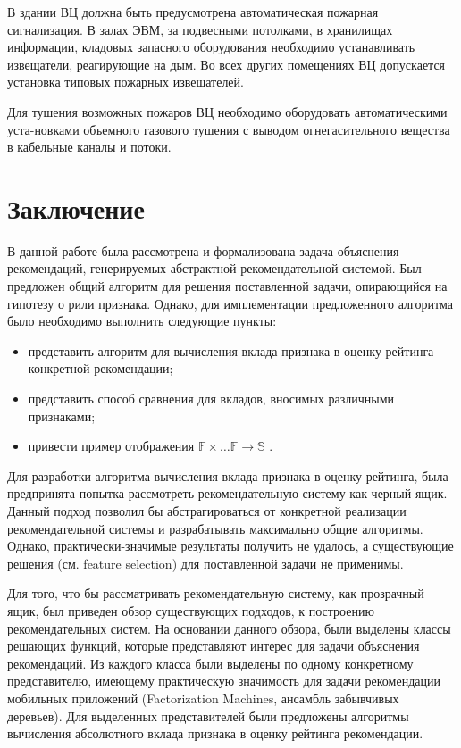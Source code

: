 \documentclass[12pt,a4paper]{report}
\begin{document}
В здании ВЦ должна быть предусмотрена автоматическая пожарная сигнализация. В залах ЭВМ, за подвесными потолками, в хранилищах информации, кладовых запасного оборудования необходимо устанавливать извещатели, реагирующие на дым. Во всех других помещениях ВЦ допускается установка типовых пожарных извещателей.

Для тушения возможных пожаров ВЦ необходимо оборудовать автоматическими уста-новками объемного газового тушения с выводом огнегасительного вещества в кабельные каналы и потоки.

\chapter{Заключение}
В данной работе была рассмотрена и формализована задача объяснения рекомендаций, генерируемых абстрактной рекомендательной системой. Был предложен общий алгоритм для решения поставленной задачи, опирающийся на гипотезу о рили признака. Однако, для имплементации предложенного алгоритма было необходимо выполнить следующие пункты:
\begin{itemize}
\item представить алгоритм для вычисления вклада признака в оценку рейтинга конкретной рекомендации;
\item представить способ сравнения для вкладов, вносимых различными признаками;
\item привести пример отображения $\mathbb{F} \times \dots \mathbb{F} \to \mathbb{S}$ .
\end{itemize}

Для разработки алгоритма вычисления вклада признака в оценку рейтинга, была предпринята попытка рассмотреть рекомендательную систему как черный ящик. Данный подход позволил бы абстрагироваться от конкретной реализации рекомендательной системы и разрабатывать максимально общие алгоритмы. Однако, практически-значимые результаты получить не удалось, а существующие решения (см. feature selection) для поставленной задачи не применимы.

Для того, что бы рассматривать рекомендательную систему, как прозрачный ящик, был приведен обзор существующих подходов, к построению рекомендательных систем. На основании данного обзора, были выделены классы решающих функций, которые представляют интерес для задачи объяснения рекомендаций. Из каждого класса были выделены по одному конкретному представителю, имеющему практическую значимость для задачи рекомендации мобильных приложений (Factorization Machines, ансамбль забывчивых деревьев). Для выделенных представителей были предложены алгоритмы вычисления абсолютного вклада признака в оценку рейтинга рекомендации.
\end{document}
